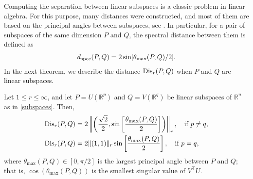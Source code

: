\documentclass[hidelinks,onefignum,onetabnum]{siamart250211}
\theoremstyle{definition}
\theoremstyle{remark}
\newcommand{\R}{\mathbb R}
\newcommand{\Dis}{{\rm Dis}}
\begin{document}
Computing the separation between linear subspaces is a classic problem in linear algebra. For this purpose, many distances were constructed, and most of them are based on the principal angles between subspaces, see \cite{YeLim}. In particular, 
for a pair of subspaces of the same dimension $P$ and $Q$, the spectral distance between them is defined as
\begin{equation}\label{spec}
d_{\rm spec}(P,Q)=2\sin[\theta_{\max}(P,Q)/2].
\end{equation}
In the next theorem, we describe the distance $\Dis_r(P,Q)$ when $P$ and $Q$ are linear subspaces.
\begin{theorem}
Let $1\leq r\leq\infty$, and let $P=U(\R^p)$  and $Q=V(\R^q)$ be linear subspaces of $\R^n$ as in \eqref{subspaces}. Then,
\begin{align*}
&\displaystyle {\rm Dis}_r(P,Q)= 2\left\Vert\left(\frac{\sqrt{2}}{2}, \sin\left[\frac{\theta_{\max}(P,Q)}{2}\right]\right)\right\Vert_r,\quad\text{if }p \neq q,\\
&\displaystyle {\rm Dis}_r(P,Q)= 2\Vert(1,1)\Vert_r\sin\left[\frac{\theta_{\max}(P,Q)}{2}\right],\quad\text{if } p=q,
\end{align*}
where $\theta_{\max}(P,Q)\in[0,\pi/2]$ is the largest principal angle between $P$ and $Q$; that is, $\cos(\theta_{\max}(P,Q))$ is the smallest singular value of $V^\top U$.

\end{theorem}
\end{document}
